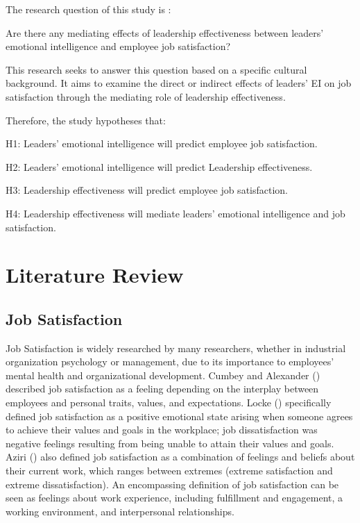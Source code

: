\documentclass[
  man,
  longtable,
  nolmodern,
  notxfonts,
  notimes,
  colorlinks=true,linkcolor=blue,citecolor=blue,urlcolor=blue]{apa7}
\begin{document}
The research question of this study is :

Are there any mediating effects of leadership effectiveness between
leaders' emotional intelligence and employee job satisfaction?

This research seeks to answer this question based on a specific cultural
background. It aims to examine the direct or indirect effects of
leaders' EI on job satisfaction through the mediating role of leadership
effectiveness.

Therefore, the study hypotheses that:

H1: Leaders' emotional intelligence will predict employee job
satisfaction.

H2: Leaders' emotional intelligence will predict Leadership
effectiveness.

H3: Leadership effectiveness will predict employee job satisfaction.

H4: Leadership effectiveness will mediate leaders' emotional
intelligence and job satisfaction.

\section{Literature Review}\label{literature-review}

\subsection{Job Satisfaction}\label{job-satisfaction}

Job Satisfaction is widely researched by many researchers, whether in
industrial organization psychology or management, due to its importance
to employees' mental health and organizational development. Cumbey and
Alexander () described job satisfaction
as a feeling depending on the interplay between employees and personal
traits, values, and expectations. Locke ()
specifically defined job satisfaction as a positive emotional state
arising when someone agrees to achieve their values and goals in the
workplace; job dissatisfaction was negative feelings resulting from
being unable to attain their values and goals. Aziri
() also defined job satisfaction as a
combination of feelings and beliefs about their current work, which
ranges between extremes (extreme satisfaction and extreme
dissatisfaction). An encompassing definition of job satisfaction can be
seen as feelings about work experience, including fulfillment and
engagement, a working environment, and interpersonal relationships.
\end{document}
